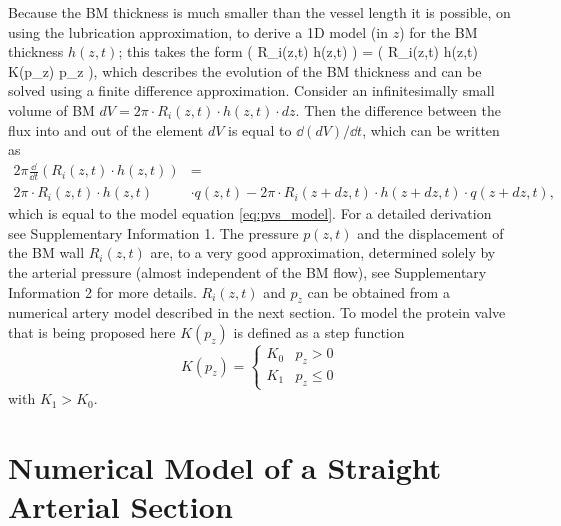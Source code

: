 \documentclass[a4paper,titlepage]{scrartcl}
\begin{document}
Because the BM thickness is much smaller than the vessel length it is possible, on using the lubrication approximation, to derive a 1D model (in $z$) for the BM thickness $h(z,t)$; this takes the form
\beq
{} \left( R_i(z,t) \cdot h(z,t) \right) =  \left( R_i(z,t) \cdot h(z,t) \cdot K(p_{z}) \cdot p_{z} \right),\label{eq:pvs_model}
\eeq
which describes the evolution of the BM thickness and can be solved using a finite difference approximation. Consider an infinitesimally small volume of BM $dV = 2\pi \cdot R_i(z,t) \cdot h(z,t) \cdot dz$. Then the difference between the flux into and out of the element $dV$ is equal to $\dd (dV)/ \dd t$, which can be written as
\begin{align}
2\pi \frac{\dd}{\dd t} \left( R_i(z,t) \cdot h(z,t) \right) &= \nonumber \\ 
2\pi \cdot R_i(z,t) \cdot h(z,t) & \cdot q(z,t) - 2\pi \cdot R_i(z + dz,t) \cdot h(z + dz,t) \cdot q(z + dz,t),
\end{align}
which is equal to the model equation \eqref{eq:pvs_model}. For a detailed derivation see Supplementary Information 1. The pressure $p(z,t)$ and the displacement of the BM wall $R_i(z,t)$ are, to a very good approximation, determined solely by the arterial pressure (\ie almost independent of the BM flow), see Supplementary Information 2 for more details. $R_i(z,t)$ and $p_z$ can be obtained from a numerical artery model described in the next section. To model the protein valve that is being proposed here $K(p_z)$ is defined as a step function
\begin{equation}
  K(p_z) = \begin{cases}
    K_0 & p_z > 0\\
    K_1 & p_z \leq 0
  \end{cases}
\end{equation}
with $K_1 > K_0$.


\section{Numerical Model of a Straight Arterial Section}
\end{document}

